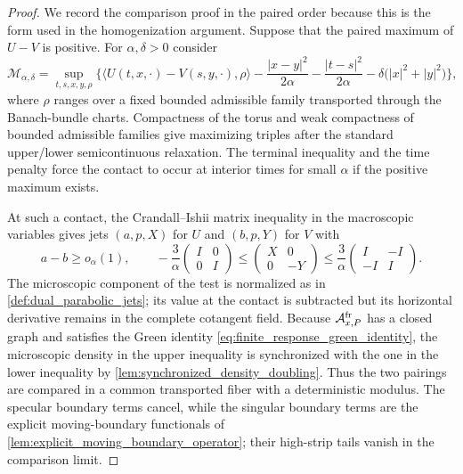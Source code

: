 \documentclass[12pt, letterpaper]{amsart}
\newcommand{\Acal}{\mathcal{A}}
\theoremstyle{plain}
\theoremstyle{definition}
\theoremstyle{remark}
\begin{document}
\begin{proof}
We record the comparison proof in the paired order because this is the form used
in the homogenization argument.  Suppose that the paired maximum of
$U-V$ is positive.  For $\alpha,\delta>0$ consider
\begin{equation}
\label{eq:duality_doubling_function}
    \mathcal M_{\alpha,\delta}
    =\sup_{t,s,x,y,\rho}
      \Big\{
      \langle U(t,x,\cdot)-V(s,y,\cdot),\rho\rangle
      -\frac{|x-y|^2}{2\alpha}-\frac{|t-s|^2}{2\alpha}
      -\delta\big(|x|^2+|y|^2\big)
      \Big\},
\end{equation}
where $\rho$ ranges over a fixed bounded admissible family transported through
the Banach-bundle charts.  Compactness of the torus and weak compactness of
bounded admissible families give maximizing triples after the standard
upper/lower semicontinuous relaxation.  The terminal inequality and the time
penalty force the contact to occur at interior times for small $\alpha$ if the
positive maximum exists.

At such a contact, the Crandall--Ishii matrix inequality in the macroscopic
variables gives jets $(a,p,X)$ for $U$ and $(b,p,Y)$ for $V$ with
\begin{equation}
    a-b\ge o_\alpha(1),\qquad
    -\frac{3}{\alpha}\begin{pmatrix}I&0\\0&I\end{pmatrix}
    \le
    \begin{pmatrix}X&0\\0&-Y\end{pmatrix}
    \le
    \frac{3}{\alpha}\begin{pmatrix}I&-I\\-I&I\end{pmatrix}.
\end{equation}
The microscopic component of the test is normalized as in
\cref{def:dual_parabolic_jets}; its value at the contact is subtracted but its
horizontal derivative remains in the complete cotangent field.  Because
$\Acal^{\rm fr}_{x,P}$ has a closed graph and satisfies the Green identity
\eqref{eq:finite_response_green_identity}, the microscopic density in the upper
inequality is synchronized with the one in the lower inequality by
\cref{lem:synchronized_density_doubling}.  Thus the two pairings are compared
in a common transported fiber with a deterministic modulus.  The specular
boundary terms cancel, while the singular boundary terms are the explicit
moving-boundary functionals of \cref{lem:explicit_moving_boundary_operator};
their high-strip tails vanish in the comparison limit.


\end{proof}
\end{document}
